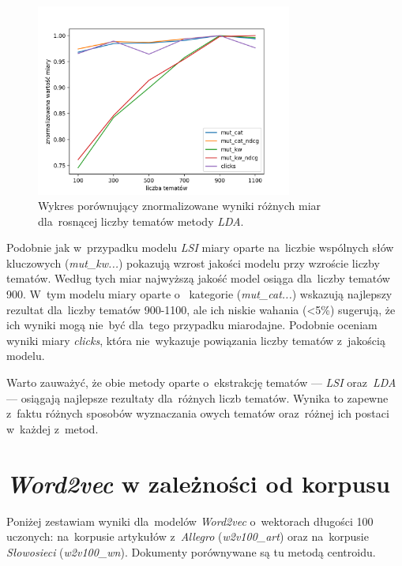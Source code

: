 \documentclass[pl]{minipw} %
\begin{document}
\begin{figure}[H]
	\centering
	\includegraphics[width=0.75\textwidth]{img/results/lda_.png}
	\caption{Wykres porównujący znormalizowane wyniki różnych miar dla~rosnącej liczby tematów metody \textit{LDA}.}
\end{figure}

Podobnie jak w~przypadku modelu \textit{LSI} miary oparte na~liczbie wspólnych słów kluczowych (\textit{mut\_kw...}) pokazują wzrost jakości modelu przy wzroście liczby tematów. Według tych miar najwyższą jakość model osiąga dla~liczby tematów 900. W~tym modelu miary oparte o~ kategorie (\textit{mut\_cat...}) wskazują najlepszy rezultat dla~liczby tematów 900-1100, ale ich niskie wahania (<5\%) sugerują, że ich wyniki mogą nie~być dla~tego przypadku miarodajne. Podobnie oceniam wyniki miary \textit{clicks}, która nie~wykazuje powiązania liczby tematów z~jakością modelu.

Warto zauważyć, że obie metody oparte o~ekstrakcję tematów --- \textit{LSI} oraz~\textit{LDA} --- osiągają najlepsze rezultaty dla~różnych liczb tematów. Wynika to zapewne z~faktu różnych sposobów wyznaczania owych tematów oraz~różnej ich postaci w~każdej z~metod.


\section{\textit{Word2vec} w zależności od korpusu}

Poniżej zestawiam wyniki dla~modelów \textit{Word2vec} o~wektorach długości 100 uczonych: na~korpusie artykułów z~\textit{Allegro} (\textit{w2v100\_art}) oraz na~korpusie \textit{Słowosieci} (\textit{w2v100\_wn}). Dokumenty porównywane są tu metodą centroidu.
\end{document}
